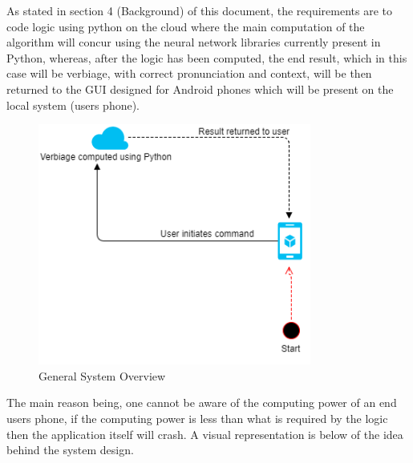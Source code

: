 As stated in section 4 (Background) of this document, the requirements are to code logic using python on the cloud where the main computation of the algorithm will concur using the neural network libraries currently present in Python, whereas, after the logic has been computed, the end result, which in this case will be verbiage, with correct pronunciation and context, will be then returned to the GUI designed for Android phones which will be present on the local system (users phone).
\begin{figure}[htpb]
    \includegraphics[width=0.8\textwidth]{figures/system-overview}
    \caption{General System Overview}
\end{figure}
The main reason being, one cannot be aware of the computing power of an end users phone, if the computing power is less than what is required by the logic then the application itself will crash. A visual representation is below of the idea behind the system design.

